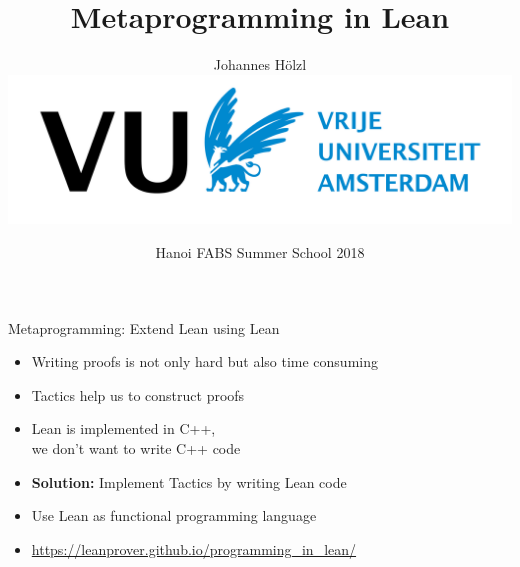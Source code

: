 \documentclass[usenames,dvipsnames]{beamer}
\title{Metaprogramming in Lean}
\author{Johannes Hölzl \\ \includegraphics{vulogo.png}}
\date{Hanoi FABS Summer School 2018}
\begin{document}
\maketitle

\begin{frame}{Metaprogramming: Extend Lean using Lean}
  \begin{itemize}
    \item Writing proofs is not only hard but also time consuming

    \item Tactics help us to construct proofs

    \item Lean is implemented in C++, \\
      we don't want to write C++ code

    \item \textbf{Solution:} Implement Tactics by writing Lean code

    \item Use Lean as functional programming language

    \item \url{https://leanprover.github.io/programming_in_lean/}

  \end{itemize}
\end{frame}
\end{document}
